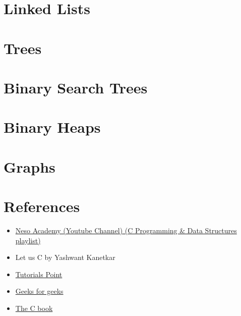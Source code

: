 \documentclass[12pt, a4paper]{article}
\begin{document}
    \section{Linked Lists}
    \section{Trees}
    \section{Binary Search Trees}
    \section{Binary Heaps}
    \section{Graphs}

	\fi


    \section{References}

	\begin{itemize} 
        \item \href{https://youtube.com/playlist?list=PLBlnK6fEyqRhX6r2uhhlubuF5QextdCSM}{Neso Academy (Youtube Channel) (C Programming \& Data Structures playlist)}
        \item Let us C by Yashwant Kanetkar    
        \item \href{https://www.tutorialspoint.com/cprogramming/index.htm}{Tutorials Point}
        \item \href{https://www.geeksforgeeks.org/c-programming-language/}{Geeks for geeks}
        \item \href{https://publications.gbdirect.co.uk/c_book/}{The C book}
	\end{itemize}
	
\end{document}
